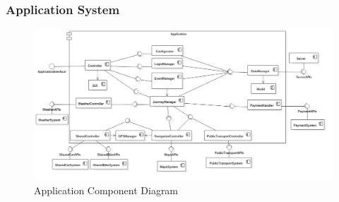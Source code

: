 \clearpage
\subsubsection{Application System}
\begin{figure}[!h]
\centering
\includegraphics[scale=0.35]{images/ComponentDiagramApplicationSystem}
\caption{Application Component Diagram}
\label{ref:componentdiagramapplicationsystem}
\end{figure}
